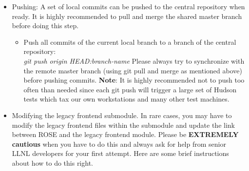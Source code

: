 \begin{itemize}
\begin{itemize}
          \item Switch to and synchronize a local master branch: \textit{git checkout master; git pull origin master}
          \item Don't forget to update the link to the legacy frontend submodule: \textit{git submodule update}
          \item Switch to your local branch and merge with local master: \textit{git checkout your-local-branch-name; git merge master}
    \item Alternatively, you can stay in your local branch and directly pull the remote master and update the legacy frontend submodule: 
           \textit{git pull origin master; git submodule update}
   \end{itemize}   

\item Pushing: A set of local commits can be pushed to the central repository when ready.
It is highly recommended to pull and merge the shared master branch before doing this step.
   \begin{itemize}
          \item Push all commits of the current local branch to a branch of the central repository:\\ \textit{git push origin HEAD:branch-name}
 Please always try to synchronize with the
          remote master branch (using git pull and merge as mentioned
          above) before pushing commits. \textbf{Note}: It is highly recommended not to push too often than
          needed since each git push will trigger a large set of
          Hudson tests which tax our own workstations and many other test machines.


   \end{itemize}

\item Modifying the legacy frontend submodule. In rare cases, you may have to modify the legacy frontend files within the submodule and update the link between ROSE and the legacy frontend module. Please be {\bf EXTREMELY cautious} when you have to do this and always
ask for help from senior LLNL developers for your first attempt. Here are some brief instructions about how to do this right.
     \begin{itemize}


\end{itemize}
\end{itemize}
